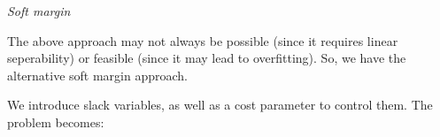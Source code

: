 \documentclass{minimal}
\begin{document}
\medskip

\textit{Soft margin}

The above approach may not always be possible (since it requires linear
seperability) or feasible (since it may lead to overfitting). So, we have the
alternative soft margin approach.

We introduce slack variables, as well as a cost parameter to control them. The
problem becomes:
$$

$$
\end{document}
